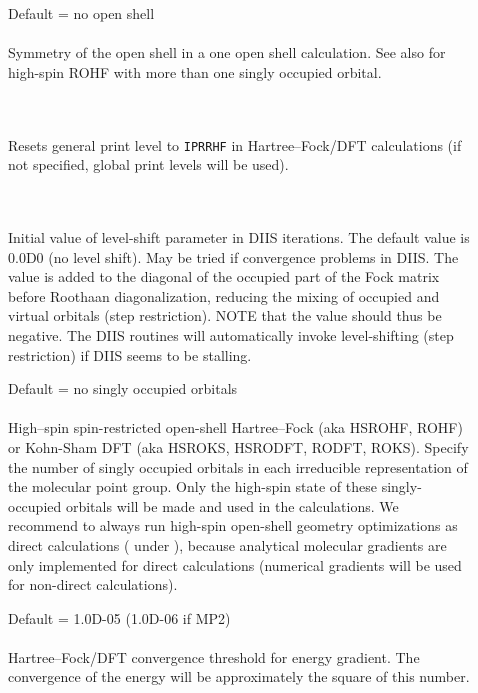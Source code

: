 \begin{description}
\item[]
  Default = no open shell\\
   \\
  Symmetry of the open shell in a one open shell
  calculation. See also  for high-spin ROHF with more than one
  singly occupied orbital.

\item[] \ \\
   \\
  Resets general print level to \verb|IPRRHF| in Hartree--Fock/DFT calculations
  (if not specified, global print levels will be used).

\item[]  \ \\
   \\
  Initial value of level-shift parameter in DIIS iterations. 
  The default value is 0.0D0 (no level shift).
  May be tried if convergence problems in DIIS. The value is added
  to the diagonal of the occupied part of the Fock matrix before
  Roothaan diagonalization, reducing the mixing of occupied and
  virtual orbitals (step restriction).
  NOTE that the value should thus be negative.  The DIIS routines
  will automatically invoke level-shifting (step restriction) if
  DIIS seems to be stalling.

\item[] Default = no singly occupied orbitals \\
     \\
  High--spin spin-restricted open-shell Hartree--Fock (aka HSROHF, ROHF)
  or Kohn-Sham DFT (aka HSROKS, HSRODFT, RODFT, ROKS).
  Specify the number of singly occupied orbitals in each irreducible representation
  of the molecular point group. Only the high-spin state of these
  singly-occupied orbitals will be made and used in the calculations.
  We recommend to always run high-spin open-shell geometry optimizations as direct calculations
  ( under ),
  because analytical molecular gradients are only implemented for direct calculations
  (numerical gradients will be used for non-direct calculations).

\item[]
  Default = 1.0D-05 (1.0D-06 if MP2)\\
   \\
  Hartree--Fock/DFT convergence threshold for energy gradient.  The convergence
  of the energy will be approximately the square of this number.

\end{description}


